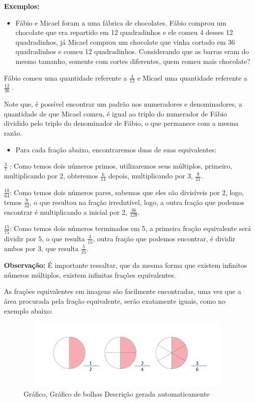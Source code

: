 \textbf{Exemplos:}

\begin{itemize}
\tightlist
\item
  Fábio e Micael foram a uma fábrica de chocolates. Fábio comprou um
  chocolate que era repartido em 12 quadradinhos e ele comeu 4 desses 12
  quadradinhos, já Micael comprou um chocolate que vinha cortado em 36
  quadradinhos e comeu 12 quadradinhos. Considerando que as barras eram
  do mesmo tamanho, somente com cortes diferentes, quem comeu mais
  chocolate?
\end{itemize}

Fábio comeu uma quantidade referente a \(\frac{4}{12}\) e Micael uma
quantidade referente a \(\frac{12}{36}\) .

Note que, é possível encontrar um padrão nos numeradores e
denominadores, a quantidade de que Micael comeu, é igual ao triplo do
numerador de Fábio dividido pelo triplo do denominador de Fábio, o que
permanece com a mesma razão.

\begin{itemize}
\tightlist
\item
  Para cada fração abaixo, encontraremos duas de suas equivalentes:
\end{itemize}

\(\frac{3}{7}\) : Como temos dois números primos, utilizaremos seus
múltiplos, primeiro, multiplicando por 2, obteremos \(\frac{6}{14}\)
depois, multiplicando por 3, \(\frac{9}{21}\).

\(\frac{18}{64}\): Como temos dois números pares, sabemos que eles são
divisíveis por 2, logo, temos \(\frac{9}{32}\), o que resultou na fração
irredutível, logo, a outra fração que podemos encontrar é multiplicando
a inicial por 2, \(\frac{36}{128}\).

\(\frac{15}{75}\): Como temos dois números terminados em 5, a primeira
fração equivalente será dividir por 5, o que resulta \(\frac{3}{15}\),
outra fração que podemos encontrar, é dividir ambos por 3, que resulta
\(\frac{5}{25}\).

\textbf{Observação:} É importante ressaltar, que da mesma forma que
existem infinitos números múltiplos, existem infinitas frações
equivalentes.

As frações equivalentes em imagens são facilmente encontradas, uma vez
que a área procurada pela fração equivalente, serão exatamente iguais,
como no exemplo abaixo:

\begin{figure}
\centering
\includegraphics[width=5.15682in,height=1.36473in]{./imgSAEB_7_MAT/media/image6.png}
\caption{Gráfico, Gráfico de bolhas Descrição gerada automaticamente}
\end{figure}


